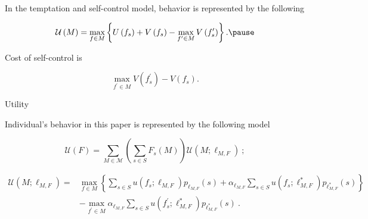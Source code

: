 \documentclass[usenames,dvipsnames,aspectratio=169,11pt, envcountsect]{beamer}
\begin{document}
\begin{frame}{\cite{gulTemptationSelfControl2001}}

	In the temptation and self-control model, behavior is represented by the following

	\vfill

	\[
		\mathcal{U} \left( M \right) = \max_{f \in M} \left\{ U \left( f_s \right) + V \left( f_s \right) - \max_{f^{\prime} \in M} V \left( f^{\prime}_s \right) \right\} . \pause
	\]

	\vfill

	Cost of self-control is

	\vfill

	\[
		\max_{f^{\prime} \in M} V \left( f^{\prime}_s \right) - V \left( f_s \right) .
	\]

\end{frame}

\begin{frame}{Utility}

	Individual's behavior in this paper is represented by the following model

	\vfill

	\begin{equation}\label{eq:contmenu1}
		\mathscr{U}(F)= \sum_{M \in \mathcal{M}} \left( \sum_{s \in S} F_{s} \left( M \right) \right) \mathcal{U} \left(M ; \ell_{M, F} \right) \: ;
	\end{equation} \pause

	\vfill

	\begin{equation}\label{eq:menu1}
		\begin{aligned}
			\mathcal{U} \left(M ; \ell_{M, F} \right) = & \max _{f \in M}\left\{\sum_{s \in S} u \left( f_{s} ; \ell_{M, F} \right) p_{\ell_{M, F}} \left( s \right) +\alpha _{\ell_{M, F}} \sum_{s \in S} u \left( f_{s} ; \ell^{*}_{M, F} \right) p_{\ell^{*}_{M, F}} \left( s \right) \right\} \\
			                                            & -\max _{f^{\prime} \in M} \alpha _{\ell_{M, F}} \sum_{s \in S} u\left(f^{\prime}_{s} ; \ell^{*}_{M, F} \right) p_{\ell^{*}_{M, F}} \left( s \right) \: .
		\end{aligned}
	\end{equation}

\end{frame}
\end{document}
